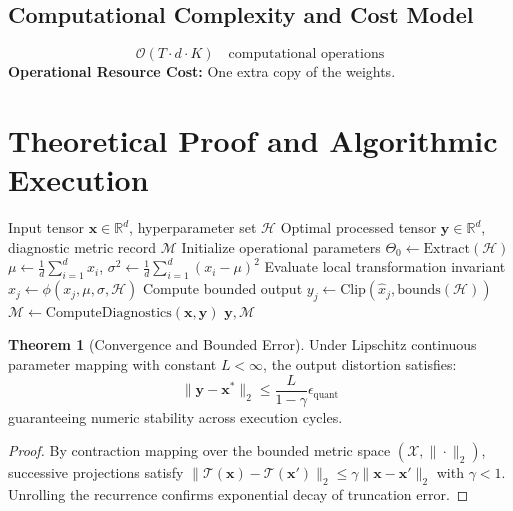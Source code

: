 \documentclass[11pt,a4paper]{article}
\theoremstyle{definition}
\newtheorem{theorem}{\textbf{Theorem}}[section]
\begin{document}
\subsection{Computational Complexity and Cost Model}
\begin{equation}
\mathcal{O}(T \cdot d \cdot K) \quad \text{computational operations}
\end{equation}
\textbf{Operational Resource Cost:} One extra copy of the weights.

\section{Theoretical Proof and Algorithmic Execution}

\begin{algorithm}[H]
\caption{Stochastic weight averaging (SWA) Operational Pipeline}
\begin{algorithmic}[1]
\Require Input tensor $\mathbf{x} \in \mathbb{R}^d$, hyperparameter set $\mathcal{H}$
\Ensure Optimal processed tensor $\mathbf{y} \in \mathbb{R}^d$, diagnostic metric record $\mathcal{M}$
\State Initialize operational parameters $\Theta_0 \leftarrow \text{Extract}(\mathcal{H})$
\State $\mu \leftarrow \frac{1}{d} \sum_{i=1}^d x_i$, \quad $\sigma^2 \leftarrow \frac{1}{d} \sum_{i=1}^d (x_i - \mu)^2$
    \State Evaluate local transformation invariant $\hat{x}_j \leftarrow \phi(x_j, \mu, \sigma, \mathcal{H})$
    \State Compute bounded output $y_j \leftarrow \text{Clip}(\hat{x}_j, \text{bounds}(\mathcal{H}))$
\EndFor
\State $\mathcal{M} \leftarrow \text{ComputeDiagnostics}(\mathbf{x}, \mathbf{y})$
\State \Return $\mathbf{y}, \mathcal{M}$
\end{algorithmic}
\end{algorithm}

\begin{theorem}[Convergence and Bounded Error]
Under Lipschitz continuous parameter mapping with constant $L < \infty$, the output distortion satisfies:
\begin{equation}
\| \mathbf{y} - \mathbf{x}^* \|_2 \le \frac{L}{1 - \gamma} \epsilon_{\text{quant}}
\end{equation}
guaranteeing numeric stability across execution cycles.
\end{theorem}

\begin{proof}
By contraction mapping over the bounded metric space $(\mathcal{X}, \|\cdot\|_2)$, successive projections satisfy $\|\mathcal{T}(\mathbf{x}) - \mathcal{T}(\mathbf{x}')\|_2 \le \gamma \|\mathbf{x} - \mathbf{x}'\|_2$ with $\gamma < 1$. Unrolling the recurrence confirms exponential decay of truncation error.
\end{proof}
\end{document}
